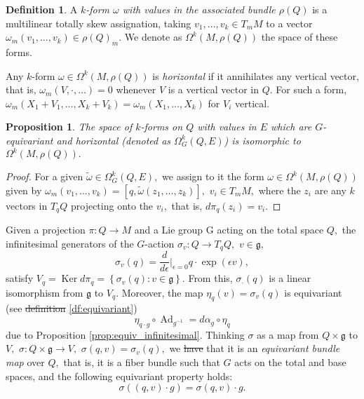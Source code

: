 \documentclass[12pt, letterpaper, reqno]{amsart}
\theoremstyle{definition}
\newtheorem{df}{Definition}
\theoremstyle{plain}
\newtheorem{prop}{Proposition}
\theoremstyle{remark}
\providecommand{\DIFadd}[1]{{\protect\color{blue}\uwave{#1}}} %
\providecommand{\DIFdel}[1]{{\protect\color{red}\sout{#1}}}                      %
\providecommand{\DIFaddbegin}{} %
\providecommand{\DIFaddend}{} %
\providecommand{\DIFdelbegin}{} %
\providecommand{\DIFdelend}{} %
\newcommand{\DIFscaledelfig}{0.5}
\newlength{\DIFdelgraphicswidth} %
\newlength{\DIFdelgraphicsheight} %
\newcommand{\DIFaddincludegraphics}[2][]{{\color{blue}\fbox{\DIFOincludegraphics[#1]{#2}}}} %
\newcommand{\DIFdelincludegraphics}[2][]{%
\sbox{\DIFdelgraphicsbox}{\DIFOincludegraphics[#1]{#2}}%
\settoboxwidth{\DIFdelgraphicswidth}{\DIFdelgraphicsbox} %
\settoboxtotalheight{\DIFdelgraphicsheight}{\DIFdelgraphicsbox} %
\scalebox{\DIFscaledelfig}{%
\parbox[b]{\DIFdelgraphicswidth}{\usebox{\DIFdelgraphicsbox}\\[-\baselineskip] \rule{\DIFdelgraphicswidth}{0em}}\llap{\resizebox{\DIFdelgraphicswidth}{\DIFdelgraphicsheight}{%
\setlength{\unitlength}{\DIFdelgraphicswidth}%
\begin{picture}(1,1)%
\thicklines\linethickness{2pt} %
{\color[rgb]{1,0,0}\put(0,0){\framebox(1,1){}}}%
{\color[rgb]{1,0,0}\put(0,0){\line( 1,1){1}}}%
{\color[rgb]{1,0,0}\put(0,1){\line(1,-1){1}}}%
\end{picture}%
}\hspace*{3pt}}} %
} %
\DeclareRobustCommand{\DIFaddbegin}{\DIFOaddbegin \let\includegraphics\DIFaddincludegraphics} %
\DeclareRobustCommand{\DIFaddend}{\DIFOaddend \let\includegraphics\DIFOincludegraphics} %
\DeclareRobustCommand{\DIFdelbegin}{\DIFOdelbegin \let\includegraphics\DIFdelincludegraphics} %
\DeclareRobustCommand{\DIFdelend}{\DIFOaddend \let\includegraphics\DIFOincludegraphics} %
\begin{document}
\begin{df}
	A \textit{$ k $-form $ \omega $ with values in the associated bundle $ \rho(Q) $} is a multilinear totally skew assignation, taking $ v_1,\dots, v_k\in T_mM $ to a vector $ \omega_m(v_1,\dots,v_k)\in \rho(Q)_m. $  We denote as $ \Omega^k(M, \rho(Q)) $ the space of these forms.
\end{df}

Any $ k $-form $ \omega\in \Omega^k(M,\rho(Q)) $ is \textit{horizontal} if it annihilates any vertical vector, that is, $ \omega_m(V,\cdot,\dots)=0 $ whenever $ V $ is a vertical vector in $ Q. $ For such a form, $ \omega_m(X_1+V_1,\dots,X_k+V_k)=\omega_m(X_1,\dots, X_k) $ for $ V_i $ vertical.

\begin{prop}
	The space of $ k $-forms on $ Q $ with values in $ E $ which are $ G $-equivariant and horizontal (denoted as $ \Omega^k_G(Q,E) $) is isomorphic to $ \Omega^k(M,\rho(Q)). $ 
\end{prop}
\begin{proof}
	For a given $ \tilde \omega\in\Omega^k_G(Q,E), $ we assign to it the form $ \omega\in\Omega^k(M, \rho(Q)) $ given by $ \omega_m(v_1,\dots,v_k) = [q,\tilde\omega(z_1,\dots,z_k)],  $  $v_i\in T_mM, $ where the $ z_i $ are any $ k $ vectors in $ T_qQ $ projecting onto the $ v_i, $ that is, $ d\pi_q(z_i)=v_i. $  
\end{proof}

Given a projection $ \pi: Q \rightarrow M $ and a Lie group G acting on the total space $ Q, $ the infinitesimal generators of the $ G $-action $ \sigma_v: Q \rightarrow T_qQ, $ $ v\in \mathfrak{g,} $ 
$$ \sigma_v(q) = \frac{d}{d\epsilon} \Big|_{\epsilon=0} q\cdot \operatorname{exp} (\epsilon v),$$
satisfy $ V_q = \operatorname{Ker}d\pi_q = \left\{ \sigma_v(q): v\in \mathfrak{g} \right\} .  $ From this, $ \sigma_\cdot(q) $ is a linear isomorphism from $ \mathfrak{g} $ to $ V_q. $ Moreover, the map $ \eta_q(v)  = \sigma_v(q) $ is equivariant (see \DIFdelbegin \DIFdel{definition }\DIFdelend \DIFaddbegin \DIFadd{Definition }\DIFaddend \ref{df:equivariant})
$$ \eta_{q\cdot g}\circ \operatorname{Ad}_{g^{-1}} = d\alpha_g  \circ \eta_q $$ 
due to Proposition \ref{prop:equiv_infinitesimal}. Thinking $ \sigma $ as a map from $ Q\times \mathfrak{g} $ to $ V, $ $ \sigma:Q\times \mathfrak{g}\rightarrow V, $ $ \sigma(q,v)= \sigma_v(q), $ we \DIFdelbegin \DIFdel{have }\DIFdelend \DIFaddbegin \DIFadd{deduce }\DIFaddend that it is an \textit{equivariant bundle map} over $ Q, $ that is, it is a fiber bundle such that $ G $ acts on the total and base spaces, and the following equivariant property holds:
$$ \sigma \left( (q,v)\cdot g \right) = \sigma(q,v) \cdot g. $$ 
\end{document}
